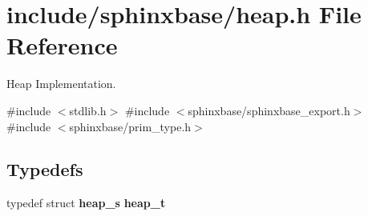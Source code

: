 \section{include/sphinxbase/heap.h \-File \-Reference}
\label{heap_8h}


\-Heap \-Implementation.  


{\ttfamily \#include $<$stdlib.\-h$>$}\*
{\ttfamily \#include $<$sphinxbase/sphinxbase\-\_\-export.\-h$>$}\*
{\ttfamily \#include $<$sphinxbase/prim\-\_\-type.\-h$>$}\*
\subsection*{\-Typedefs}
\begin{DoxyCompactItemize}
\item 
typedef struct {\bf heap\-\_\-s} {\bfseries heap\-\_\-t}\label{heap_8h_a0ffa4ec8648c254bf19eee352b69dc7a}

\end{DoxyCompactItemize}
